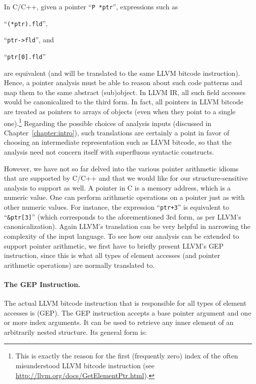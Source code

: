 In C/C++, given a pointer ``\texttt{P *ptr}'', expressions
such as
\begin{inparaenum}[(i)]
\item ``\texttt{(*ptr).fld}'',
\item ``\texttt{ptr->fld}'', and
\item ``\texttt{ptr[0].fld}''
\end{inparaenum}
are equivalent (and will be translated to the same LLVM bitcode
instruction). Hence, a pointer analysis must be able to reason about
such code patterns and map them to the same abstract (sub)object. In
LLVM IR, all such field accesses would be canonicalized to the third
form. In fact, all pointers in LLVM bitcode are treated as pointers to
arrays of objects (even when they point to a single
one).\footnote{This is exactly the reason for the first (frequently
  zero) index of the often misunderstood  LLVM
  bitcode instruction (see
  \url{http://llvm.org/docs/GetElementPtr.html}).}  Regarding the
possible choices of analysis inputs (discussed in
Chapter~\ref{chapter:intro}), such translations are certainly a point
in favor of choosing an intermediate representation such as LLVM
bitcode, so that the analysis need not concern itself with superfluous
syntactic constructs.

However, we have not so far delved into the various pointer arithmetic
idioms that are supported by C/C++ and that we would like for our
structure-sensitive analysis to support as well. A pointer in C is a
memory address, which is a numeric value. One can perform arithmetic
operations on a pointer just as with other numeric values. For
instance, the expression ``\texttt{ptr+3}'' is equivalent to
``\texttt{&ptr[3]}'' (which corresponds to the aforementioned
3rd form, as per LLVM's canonicalization).  Again LLVM's translation
can be very helpful in narrowing the complexity of the input
language. To see how our analysis can be extended to support pointer
arithmetic, we first have to briefly present LLVM's GEP instruction,
since this is what all types of element accesses (and pointer
arithmetic operations) are normally translated to.

\paragraph{The GEP Instruction.} The actual LLVM bitcode instruction
that is responsible for all types of element accesses is
 (GEP). The GEP instruction accepts a base
pointer argument and one or more index arguments. It can be used to
retrieve any inner element of an arbitrarily nested structure. Its
general form is:

